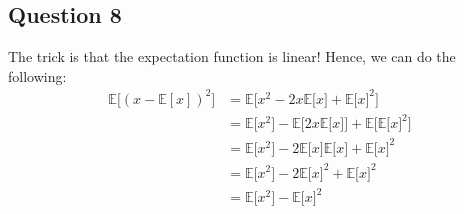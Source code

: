 \documentclass[11pt]{article}
\newcommand{\E}{\mathbb{E}}
\begin{document}
\subsection*{Question 8}
The trick is that the expectation function is linear! Hence, we can do the following:
\begin{align*}
    \E\big[(x-\E[x])^2\big] &= \E\big[ x^2 -2x\E\big[x\big] + \E\big[x\big]^2 \big]\\
    &=\E\big[x^2\big] - \E\big[2x\E\big[x\big]\big] + \E\big[\E \big[ x \big]^2\big]\\
    &= \E\big[x^2\big] - 2 \E\big[x\big]\E\big[x\big] + \E\big[x\big]^2\\
    &= \E\big[x^2\big] - 2 \E\big[x\big]^2 + \E\big[x\big]^2\\
    &= \E\big[x^2\big] - \E\big[x\big]^2
\end{align*}
\end{document}
